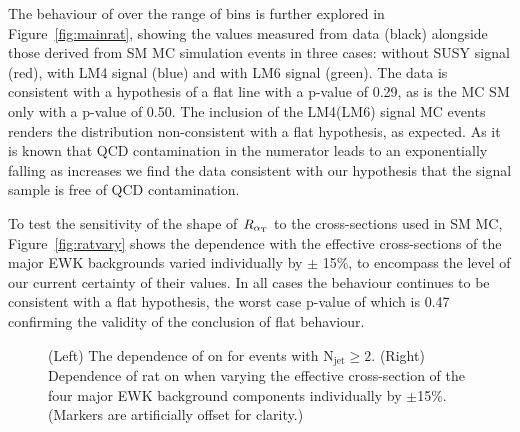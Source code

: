 The behaviour of \RaT over the range of \HT bins is further explored in Figure~\ref{fig:mainrat}, showing the values measured from data (black) alongside those derived from SM MC simulation events in three cases: without SUSY signal (red), with LM4 signal (blue) and with LM6 signal (green). The data is consistent with a hypothesis of a flat line with a p-value of 0.29, as is the MC SM only with a p-value of 0.50. The inclusion of the LM4(LM6) signal MC events renders the distribution non-consistent with a flat hypothesis, as expected. As it is known that QCD contamination in the numerator leads to an exponentially falling \RaT as \HT increases we find the data consistent with our hypothesis that the signal sample is free of QCD contamination.

To test the sensitivity of the shape of $R_{\alpha_{\text{T}}}$ to the cross-sections used in SM MC, Figure~\ref{fig:ratvary} shows the \HT dependence with the effective cross-sections of the major EWK backgrounds varied individually by $\pm$ 15\%, to encompass the level of our current certainty of their values. In all cases the behaviour continues to be consistent with a flat hypothesis, the worst case p-value of which is 0.47 confirming the validity of the conclusion of flat behaviour.

\begin{figure}[h]
  \begin{center}
      \caption{\label{fig:rat_vs_ht} (Left) The dependence of \RaT on
      \HT for events with N$_{\mathrm{jet}} \geq 2$. (Right) Dependence of rat on
      \HT when varying the effective cross-section of the four major
      EWK background components individually by $\pm$15\%. (Markers
      are artificially offset for clarity.)  }
  \end{center}
\end{figure}

